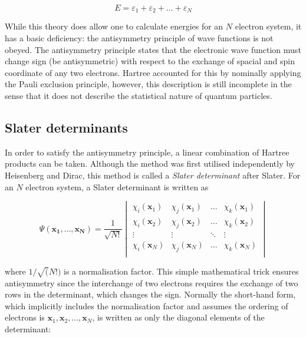 \begin{equation}
E = \varepsilon_1 + \varepsilon_2 + \dots + \varepsilon_N
\end{equation}

While this theory does allow one to calculate energies for an $N$ electron system, it has a basic deficiency: the antisymmetry principle of wave functions is not obeyed. The antisymmetry principle states that the electronic wave function must change sign (be antisymmetric) with respect to the exchange of spacial and spin coordinate of any two electrons. Hartree accounted for this by nominally applying the Pauli exclusion principle, however, this description is still incomplete in the sense that it does not describe the statistical nature of quantum particles.

\subsection{Slater determinants}

In order to satisfy the antisymmetry principle, a linear combination of Hartree products can be taken. Although the method was first utilised independently by Heisenberg\cite{Heisenberg1926} and Dirac,\cite{Dirac1926} this method is called a \emph{Slater determinant} after Slater.\cite{Slater1929} For an $N$ electron system, a Slater determinant is written as

\begin{equation}
\Psi(\mathbf{x_1},\ldots,\mathbf{x_N}) = \frac{1}{\sqrt{N!}}
\begin{vmatrix}
\chi_i(\mathbf{x}_1) & \chi_j(\mathbf{x}_1) & \dots & \chi_k(\mathbf{x}_1) \\
\chi_i(\mathbf{x}_2) & \chi_j(\mathbf{x}_2) & \dots & \chi_k(\mathbf{x}_2) \\
\vdots & \vdots & \ddots & \vdots \\
\chi_i(\mathbf{x}_N) & \chi_j(\mathbf{x}_N) & \dots & \chi_k(\mathbf{x}_N) \\
\end{vmatrix}
\end{equation}

\noindent where $1/\sqrt(N!)$ is a normalisation factor. This simple mathematical trick ensures antisymmetry since the interchange of two electrons requires the exchange of two rows in the determinant, which changes the sign. Normally the short-hand form, which implicitly includes the normalisation factor and assumes the ordering of electrons is $\mathbf{x}_1,\mathbf{x}_2,\dots,\mathbf{x}_N$, is written as only the diagonal elements of the determinant:

